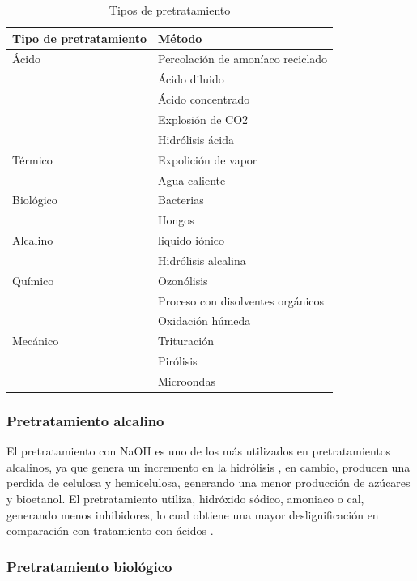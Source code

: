 \documentclass[12pt]{article}
\begin{document}
		\begin{table}[H]
		\centering  
		\caption{Tipos de pretratamiento }%
		\begin{tabular}{  | p{5cm} | p{6.5cm} |}
		\hline\textbf{ Tipo de pretratamiento} & \textbf{ Método}\\ \hline 
		Ácido     & Percolación de amoníaco reciclado  \\ 
		&  Ácido diluido  \\
		&  Ácido concentrado \\
		&   Explosión de CO2  \\ 
		&   Hidrólisis ácida \\ \hline 
		Térmico   & Expolición de vapor\\
		&  Agua caliente \\ \hline
		Biológico & Bacterias \\
		&  Hongos \\ \hline
		Alcalino  & liquido iónico  \\
		& Hidrólisis alcalina \\ \hline
		Químico   & Ozonólisis\\
		&  Proceso con disolventes orgánicos\\
		& Oxidación húmeda \\ \hline
		Mecánico  & Trituración \\
		&  Pirólisis \\
		&  Microondas \\ \hline
		
		\end{tabular}
		\label{tipos de pretratamientos}
	\end{table}


\subsubsection{Pretratamiento alcalino}

El pretratamiento con NaOH es uno de los más utilizados en pretratamientos alcalinos,  ya que genera un incremento en la hidrólisis \cite{espinosa2021pretratamiento}, en cambio, producen una perdida de celulosa y hemicelulosa, generando una menor producción de azúcares y bioetanol.
El pretratamiento utiliza, hidróxido sódico, amoniaco o cal, generando menos inhibidores, lo cual obtiene una mayor deslignificación en comparación con tratamiento con ácidos \cite{valles2022estudio}.

\subsubsection{Pretratamiento biológico }
\end{document}
